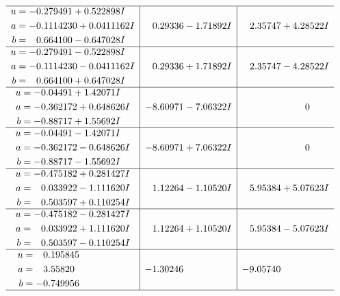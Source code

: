 \documentclass[1p]{elsarticle_modified}
\theoremstyle{definition}
\begin{document}
$$\begin{array}{c|c|c}
 \hline 
\begin{aligned}
u &= -0.279491 + 0.522898 I \\
a &= -0.1114230 + 0.0411162 I \\
b &= \phantom{-}0.664100 - 0.647028 I\end{aligned}
 & \phantom{-}0.29336 - 1.71892 I & \phantom{-}2.35747 + 4.28522 I \\ \hline\begin{aligned}
u &= -0.279491 - 0.522898 I \\
a &= -0.1114230 - 0.0411162 I \\
b &= \phantom{-}0.664100 + 0.647028 I\end{aligned}
 & \phantom{-}0.29336 + 1.71892 I & \phantom{-}2.35747 - 4.28522 I \\ \hline\begin{aligned}
u &= -0.04491 + 1.42071 I \\
a &= -0.362172 + 0.648626 I \\
b &= -0.88717 + 1.55692 I\end{aligned}
 & -8.60971 - 7.06322 I & \phantom{-0.000000 } 0 \\ \hline\begin{aligned}
u &= -0.04491 - 1.42071 I \\
a &= -0.362172 - 0.648626 I \\
b &= -0.88717 - 1.55692 I\end{aligned}
 & -8.60971 + 7.06322 I & \phantom{-0.000000 } 0 \\ \hline\begin{aligned}
u &= -0.475182 + 0.281427 I \\
a &= \phantom{-}0.033922 - 1.111620 I \\
b &= \phantom{-}0.503597 + 0.110254 I\end{aligned}
 & \phantom{-}1.12264 - 1.10520 I & \phantom{-}5.95384 + 5.07623 I \\ \hline\begin{aligned}
u &= -0.475182 - 0.281427 I \\
a &= \phantom{-}0.033922 + 1.111620 I \\
b &= \phantom{-}0.503597 - 0.110254 I\end{aligned}
 & \phantom{-}1.12264 + 1.10520 I & \phantom{-}5.95384 - 5.07623 I \\ \hline\begin{aligned}
u &= \phantom{-}0.195845\phantom{ +0.000000I} \\
a &= \phantom{-}3.55820\phantom{ +0.000000I} \\
b &= -0.749956\phantom{ +0.000000I}\end{aligned}
 & -1.30246\phantom{ +0.000000I} & -9.05740\phantom{ +0.000000I}\\
 \hline 
 \end{array}$$\newpage\newpage\renewcommand{\arraystretch}{1}
\end{document}
